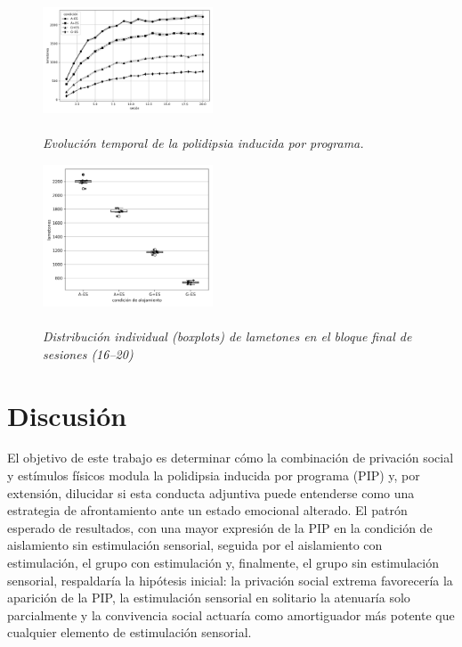 \documentclass[12pt,a4paper]{article}
\begin{document}
\begin{multicols}{2}
\begin{figure}[H]
\begin{doublespace}
\captionsetup{labelfont=bf, labelsep=none}
\caption{\textit{\protect\\Evolución temporal de la polidipsia inducida por programa.}}
\label{fig:figura1}
\end{doublespace}
\centering
\includegraphics[width=0.45\textwidth]{figura1.png}
\end{figure}

\begin{figure}[H]
\begin{doublespace}
\captionsetup{labelfont=bf, labelsep=none}    
\caption{\textit{\protect\\Distribución individual (boxplots) de lametones en el bloque final de sesiones (16–20)}}
\label{fig:figura2}
\end{doublespace}
\centering
\includegraphics[width=0.45\textwidth]{figura2.png}
\end{figure}


\section{Discusión}

El objetivo de este trabajo es determinar cómo la combinación de privación social y estímulos físicos modula la polidipsia inducida por programa (PIP) y, por extensión, dilucidar si esta conducta adjuntiva puede entenderse como una estrategia de afrontamiento ante un estado emocional alterado. El patrón esperado de resultados, con una mayor expresión de la PIP en la condición de aislamiento sin estimulación sensorial, seguida por el aislamiento con estimulación, el grupo con estimulación y, finalmente, el grupo sin estimulación sensorial, respaldaría la hipótesis inicial: la privación social extrema favorecería la aparición de la PIP, la estimulación sensorial en solitario la atenuaría solo parcialmente y la convivencia social actuaría como amortiguador más potente que cualquier elemento de estimulación sensorial.


\end{multicols}
\end{document}
